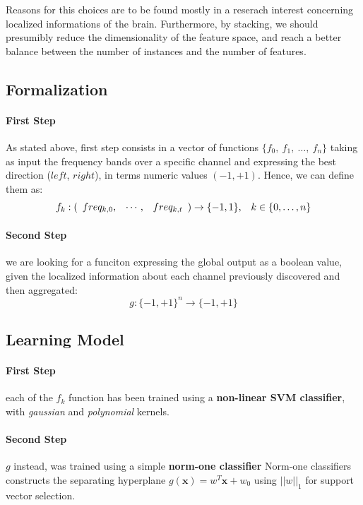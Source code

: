 \documentclass[10pt]{article}
\begin{document}
Reasons for this choices are to be found mostly in a reserach interest concerning localized informations of the brain.
Furthermore, by stacking, we should presumibly
reduce the dimensionality of the feature space, and reach a better balance between the number of instances and the number of features.

\subsection{Formalization} 

\paragraph{First Step} As stated above, first step consists in a vector of functions
$ \{f_0,\ f_1,\ \dots,\ f_n \}$ 
taking as input the frequency bands over a specific channel and expressing the best direction ($left$, $right$), in terms numeric values $(-1, +1)$. Hence, we can define them as:
$$
\begin{array}{lr}
f_k: (\begin{array}{l l l} freq_{k, 0}, & \cdots, & freq_{k, t} \end{array}) \to \{-1, 1\},
&
k \in \{0, \dots, n\}
\end{array}
$$ 

\paragraph{Second Step} we are looking for a funciton expressing the global output as a boolean value, given the localized information about each channel previously discovered and then aggregated:
$$
g: \{-1, +1\}^n \to \{-1, +1\}
$$


\subsection{Learning Model}
\label{learning_model}

\paragraph{First Step} each of the ${f_k}$ function has been trained using a \textbf{non-linear SVM classifier}, with \emph{gaussian} and \emph{polynomial} kernels. 

\paragraph{Second Step} $g$ instead, was trained using a simple \textbf{norm-one classifier}
Norm-one classifiers constructs the separating hyperplane 
$g(\boldsymbol{x}) = w^T\boldsymbol{x} + w_0$ using $||w||_1$ for support vector selection.
\end{document}
